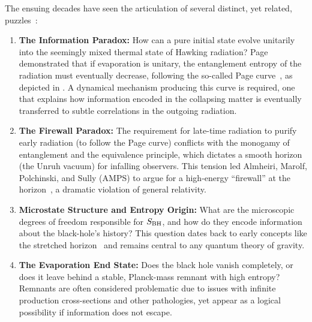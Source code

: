 \documentclass[a4paper,11pt]{article}
\theoremstyle{plain}
\theoremstyle{definition}
\theoremstyle{remark}
\begin{document}
The ensuing decades have seen the articulation of several distinct, yet related, puzzles~\cite{Mathur:2009, Harlow:2016}:
\begin{enumerate}
    \item \textbf{The Information Paradox:} How can a pure initial state evolve unitarily into the seemingly mixed thermal state of Hawking radiation? Page demonstrated that if evaporation is unitary, the entanglement entropy of the radiation must eventually decrease, following the so-called Page curve~\cite{Page:1993}, as depicted in . A dynamical mechanism producing this curve is required, one that explains how information encoded in the collapsing matter is eventually transferred to subtle correlations in the outgoing radiation.
    \item \textbf{The Firewall Paradox:} The requirement for late-time radiation to purify early radiation (to follow the Page curve) conflicts with the monogamy of entanglement and the equivalence principle, which dictates a smooth horizon (the Unruh vacuum) for infalling observers. This tension led Almheiri, Marolf, Polchinski, and Sully (AMPS) to argue for a high-energy ``firewall'' at the horizon~\cite{AMPS:2013}, a dramatic violation of general relativity.
    \item \textbf{Microstate Structure and Entropy Origin:} What are the microscopic degrees of freedom responsible for $S_{\rm BH}$, and how do they encode information about the black\nobreakdash-hole's history? This question dates back to early concepts like the stretched horizon~\cite{Susskind:1993} and remains central to any quantum theory of gravity.
    \item \textbf{The Evaporation End State:} Does the black hole vanish completely, or does it leave behind a stable, Planck-mass remnant with high entropy? Remnants are often considered problematic due to issues with infinite production cross-sections and other pathologies, yet appear as a logical possibility if information does not escape.
\end{enumerate}
\end{document}
